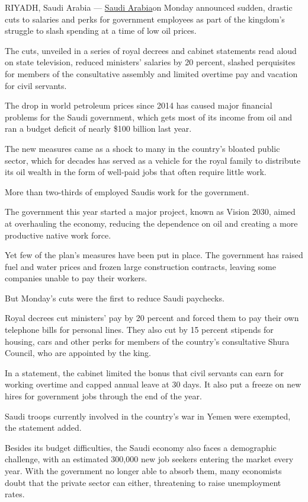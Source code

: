 RIYADH, Saudi Arabia ---
\href{http://www.nytimes3xbfgragh.onion/topic/destination/saudi-arabia?8qa}{Saudi
Arabia}on Monday announced sudden, drastic cuts to salaries and perks
for government employees as part of the kingdom's struggle to slash
spending at a time of low oil prices.

The cuts, unveiled in a series of royal decrees and cabinet statements
read aloud on state television, reduced ministers' salaries by 20
percent, slashed perquisites for members of the consultative assembly
and limited overtime pay and vacation for civil servants.

The drop in world petroleum prices since 2014 has caused major financial
problems for the Saudi government, which gets most of its income from
oil and ran a budget deficit of nearly \$100 billion last year.

The new measures came as a shock to many in the country's bloated public
sector, which for decades has served as a vehicle for the royal family
to distribute its oil wealth in the form of well-paid jobs that often
require little work.

More than two-thirds of employed Saudis work for the government.

The government this year started a major project, known as Vision 2030,
aimed at overhauling the economy, reducing the dependence on oil and
creating a more productive native work force.

Yet few of the plan's measures have been put in place. The government
has raised fuel and water prices and frozen large construction
contracts, leaving some companies unable to pay their workers.

But Monday's cuts were the first to reduce Saudi paychecks.

Royal decrees cut ministers' pay by 20 percent and forced them to pay
their own telephone bills for personal lines. They also cut by 15
percent stipends for housing, cars and other perks for members of the
country's consultative Shura Council, who are appointed by the king.

In a statement, the cabinet limited the bonus that civil servants can
earn for working overtime and capped annual leave at 30 days. It also
put a freeze on new hires for government jobs through the end of the
year.

Saudi troops currently involved in the country's war in Yemen were
exempted, the statement added.

Besides its budget difficulties, the Saudi economy also faces a
demographic challenge, with an estimated 300,000 new job seekers
entering the market every year. With the government no longer able to
absorb them, many economists doubt that the private sector can either,
threatening to raise unemployment rates.

